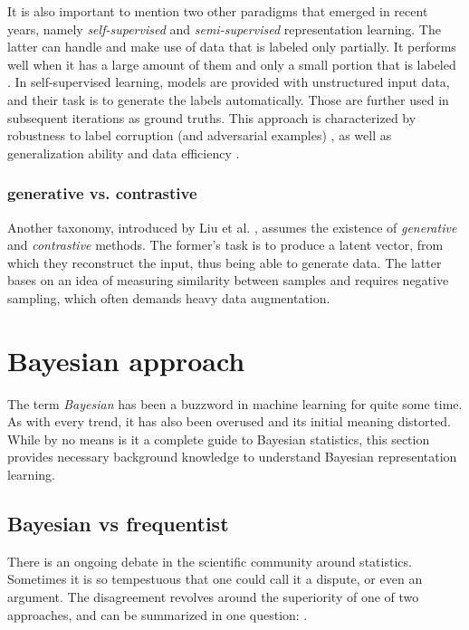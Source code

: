 \vspace{\baselineskip}
It is also important to mention two other paradigms that emerged in recent years, namely \textit{self-supervised} and \textit{semi-supervised} representation learning. The latter can handle and make use of data that is labeled only partially. It performs well when it has a large amount of them and only a small portion that is labeled \cite{Engelen2020}. In self-supervised learning, models are provided with unstructured input data, and their task is to generate the labels automatically. Those are further used in subsequent iterations as ground truths. This approach is characterized by robustness to label corruption (and adversarial examples) \cite{Hendrycks2019}, as well as generalization ability and data efficiency \cite{Liu2020}. 

\subsubsection{generative vs. contrastive}
Another taxonomy, introduced by Liu et al. \cite{Liu2020}, assumes the existence of \textit{generative} and \textit{contrastive} methods. The former's task is to produce a latent vector, from which they reconstruct the input, thus being able to generate data. The latter bases on an idea of measuring similarity between samples and  requires negative sampling, which often demands heavy data augmentation.

\section{Bayesian approach}
The term \textit{Bayesian} has been a buzzword in machine learning for quite some time. As with every trend, it has also been overused and its initial meaning distorted. While by no means is it a complete guide to Bayesian statistics, this section provides necessary background knowledge to understand Bayesian representation learning. 


\subsection{Bayesian vs frequentist}
There is an ongoing debate in the scientific community around statistics. Sometimes it is so tempestuous that one could call it a dispute, or even an argument. The disagreement revolves around the superiority of one of two approaches, and can be summarized in one question: .

